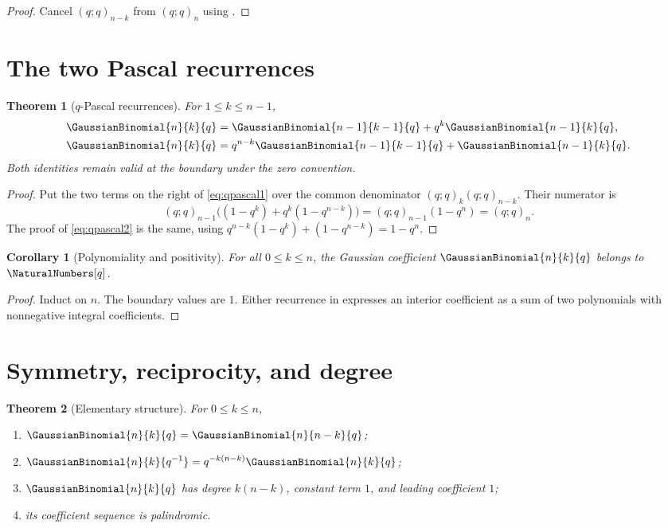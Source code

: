 \documentclass[11pt,a4paper,oneside,openany]{book}
\newtheorem{theorem}{Theorem}[chapter]
\newtheorem{corollary}[corollary]{Corollary}
\theoremstyle{definition}
\theoremstyle{remark}
\begin{document}
\begin{proof}
Cancel $(q;q)_{n-k}$ from $(q;q)_n$ using .
\end{proof}

\section{The two Pascal recurrences}

\begin{theorem}[$q$-Pascal recurrences]\label{thm:qpascal}
For $1\le k\le n-1$,
\begin{align}
 \GaussianBinomial{n}{k}{q}&=\GaussianBinomial{n-1}{k-1}{q}+q^k\GaussianBinomial{n-1}{k}{q},\label{eq:qpascal1}\\
 \GaussianBinomial{n}{k}{q}&=q^{n-k}\GaussianBinomial{n-1}{k-1}{q}+\GaussianBinomial{n-1}{k}{q}.\label{eq:qpascal2}
\end{align}
Both identities remain valid at the boundary under the zero convention.
\end{theorem}

\begin{proof}
Put the two terms on the right of \eqref{eq:qpascal1} over the common denominator $(q;q)_k(q;q)_{n-k}$.  Their numerator is
\[
 (q;q)_{n-1}\bigl((1-q^k)+q^k(1-q^{n-k})\bigr)
 =(q;q)_{n-1}(1-q^n)=(q;q)_n.
\]
The proof of \eqref{eq:qpascal2} is the same, using
\(
 q^{n-k}(1-q^k)+(1-q^{n-k})=1-q^n.
\)
\end{proof}

\begin{corollary}[Polynomiality and positivity]\label{cor:positivity}
For all $0\le k\le n$, the Gaussian coefficient $\GaussianBinomial{n}{k}{q}$ belongs to $\NaturalNumbers[q]$.
\end{corollary}

\begin{proof}
Induct on $n$.  The boundary values are $1$.  Either recurrence in  expresses an interior coefficient as a sum of two polynomials with nonnegative integral coefficients.
\end{proof}

\section{Symmetry, reciprocity, and degree}

\begin{theorem}[Elementary structure]\label{thm:qbinom-structure}
For $0\le k\le n$,
\begin{enumerate}[label=\textup{(\roman*)}]
\item $\GaussianBinomial{n}{k}{q}=\GaussianBinomial{n}{n-k}{q}$;
\item $\displaystyle \GaussianBinomial{n}{k}{q^{-1}}=q^{-k(n-k)}\GaussianBinomial{n}{k}{q}$;
\item $\GaussianBinomial{n}{k}{q}$ has degree $k(n-k)$, constant term $1$, and leading coefficient $1$;
\item its coefficient sequence is palindromic.
\end{enumerate}
\end{theorem}
\end{document}
